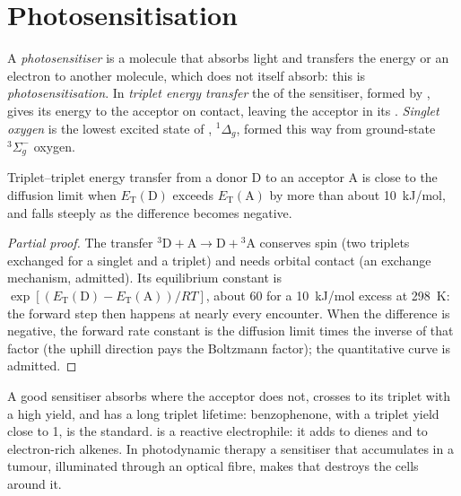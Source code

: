 \section{Photosensitisation}

\begin{definition}\label{def:b3:photochemistry:sensitisation}
A \emph{photosensitiser} is a molecule that absorbs light
and transfers the energy or an electron to another molecule, which does not
itself absorb: this is \emph{photosensitisation}. In
\emph{triplet energy transfer} the  of
the sensitiser, formed by , gives its energy to the
acceptor on contact, leaving the acceptor in its . \emph{Singlet
oxygen} is the lowest excited state of ,
${}^1\Delta_g$, formed this way from ground-state ${}^3\Sigma_g^-$ oxygen.
\end{definition}

\begin{proposition}\label{prop:b3:photochemistry:sensitisation-condition}
Triplet--triplet energy transfer from a donor D to an acceptor A is close to the
diffusion limit when $E_{\mathrm T}(\mathrm D)$ exceeds $E_{\mathrm T}(\mathrm A)$ by more than about \qty{10}{kJ/mol}, and
falls steeply as the difference becomes negative.
\end{proposition}

\begin{proof}[Partial proof]
The transfer ${}^3\mathrm D + \mathrm A \to \mathrm D + {}^3\mathrm A$ conserves spin (two triplets exchanged for a
singlet and a triplet) and needs orbital contact (an exchange mechanism,
admitted). Its equilibrium constant is $\exp[(E_{\mathrm T}(\mathrm D) - E_{\mathrm T}(\mathrm A))/RT]$, about 60 for a
\qty{10}{kJ/mol} excess at \qty{298}{K}: the forward step then happens at nearly every
encounter. When the difference is negative, the forward rate constant is the
diffusion limit times the inverse of that factor (the uphill direction pays
the Boltzmann factor); the quantitative curve is admitted.
\end{proof}

A good sensitiser absorbs where the acceptor does not, crosses to its triplet
with a high yield, and has a long triplet lifetime: benzophenone, with a
triplet yield close to 1, is the standard.  is a reactive
electrophile: it adds to dienes and to electron-rich alkenes. In photodynamic
therapy a sensitiser that accumulates in a tumour, illuminated through an
optical fibre, makes  that destroys the cells around it.

